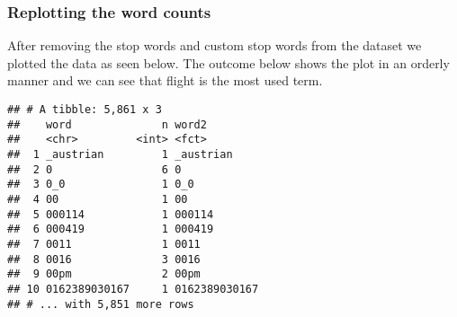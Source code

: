 \documentclass[
]{article}
\newenvironment{Shaded}{\begin{snugshade}}{\end{snugshade}}
\newcommand{\CommentTok}[1]{\textcolor[rgb]{0.56,0.35,0.01}{\textit{#1}}}
\newcommand{\DataTypeTok}[1]{\textcolor[rgb]{0.13,0.29,0.53}{#1}}
\newcommand{\DecValTok}[1]{\textcolor[rgb]{0.00,0.00,0.81}{#1}}
\newcommand{\KeywordTok}[1]{\textcolor[rgb]{0.13,0.29,0.53}{\textbf{#1}}}
\newcommand{\NormalTok}[1]{#1}
\newcommand{\OperatorTok}[1]{\textcolor[rgb]{0.81,0.36,0.00}{\textbf{#1}}}
\newcommand{\StringTok}[1]{\textcolor[rgb]{0.31,0.60,0.02}{#1}}
\begin{document}
\hypertarget{replotting-the-word-counts}{%
\subsubsection{Replotting the word
counts}\label{replotting-the-word-counts}}

After removing the stop words and custom stop words from the dataset we
plotted the data as seen below. The outcome below shows the plot in an
orderly manner and we can see that flight is the most used term.

\begin{Shaded}
\end{Shaded}

\begin{verbatim}
## # A tibble: 5,861 x 3
##    word              n word2        
##    <chr>         <int> <fct>        
##  1 _austrian         1 _austrian    
##  2 0                 6 0            
##  3 0_0               1 0_0          
##  4 00                1 00           
##  5 000114            1 000114       
##  6 000419            1 000419       
##  7 0011              1 0011         
##  8 0016              3 0016         
##  9 00pm              2 00pm         
## 10 0162389030167     1 0162389030167
## # ... with 5,851 more rows
\end{verbatim}

\begin{Shaded}
\end{Shaded}
\end{document}
